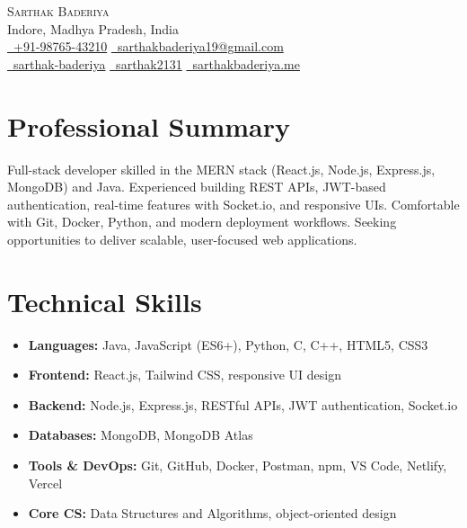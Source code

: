 \documentclass[letterpaper,11pt]{article}
\begin{document}
\begin{center}
    {\Huge \scshape \color{headingcolor} Sarthak Baderiya} \\[4pt]
    {\small \color{bodycolor} Indore, Madhya Pradesh, India} \\[6pt]
    \small
    \href{tel:+919876543210}{\faPhone\ +91-98765-43210} \quad
    \href{mailto:sarthakbaderiya19@gmail.com}{\faEnvelope\ sarthakbaderiya19@gmail.com} \\[4pt]
    \href{https://www.linkedin.com/in/sarthak-baderiya/}{\faLinkedin\ sarthak-baderiya} \quad
    \href{https://github.com/sarthak2131}{\faGithub\ sarthak2131} \quad
    \href{https://www.sarthakbaderiya.me/}{\faGlobe\ sarthakbaderiya.me}
\end{center}

\section{Professional Summary}
\small\color{bodycolor}
Full-stack developer skilled in the MERN stack (React.js, Node.js, Express.js, MongoDB) and Java. Experienced building REST APIs, JWT-based authentication, real-time features with Socket.io, and responsive UIs. Comfortable with Git, Docker, Python, and modern deployment workflows. Seeking opportunities to deliver scalable, user-focused web applications.
\normalsize\color{black}

\section{Technical Skills}
\vspace{-4pt}
\begin{itemize}[leftmargin=0.15in, label={}, itemsep=1pt, parsep=0pt, topsep=0pt]
  \item \textbf{Languages:} Java, JavaScript (ES6+), Python, C, C++, HTML5, CSS3
  \item \textbf{Frontend:} React.js, Tailwind CSS, responsive UI design
  \item \textbf{Backend:} Node.js, Express.js, RESTful APIs, JWT authentication, Socket.io
  \item \textbf{Databases:} MongoDB, MongoDB Atlas
  \item \textbf{Tools \& DevOps:} Git, GitHub, Docker, Postman, npm, VS Code, Netlify, Vercel
  \item \textbf{Core CS:} Data Structures and Algorithms, object-oriented design
\end{itemize}
\vspace{-8pt}
\end{document}
